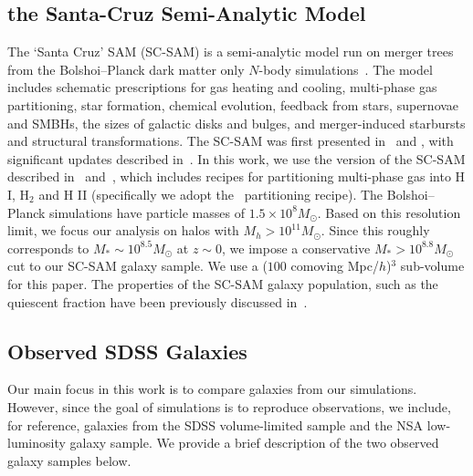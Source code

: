 \documentclass[preprint2,tighten]{aastex62}
\begin{document}
\subsection{the Santa-Cruz Semi-Analytic Model} \label{sec:scsam}
The `Santa Cruz' SAM (SC-SAM) is a semi-analytic model run on 
merger trees from the Bolshoi--Planck dark matter only $N$-body 
simulations~\citep{rodriguez-puebla2016}. The model includes 
schematic prescriptions for gas heating and cooling, multi-phase 
gas partitioning, star formation, chemical evolution, feedback 
from stars, supernovae and SMBHs, the sizes of galactic disks and 
bulges, and merger-induced starbursts and structural transformations. 
The SC-SAM was first presented in~\cite{somerville1999} and 
\cite{somerville2001}, with significant updates described 
in~\cite{somerville2008, somerville2008a, somerville2012, porter2014, 
popping2014, somerville2015a}. In this work, we use the version of 
the SC-SAM described in~\cite{popping2014} and~\cite{somerville2015a}, 
which includes recipes for partitioning multi-phase gas into H I, 
H$_2$ and H II (specifically we adopt the~\citealt{gnedin2011} 
partitioning recipe). The Bolshoi--Planck simulations have particle 
masses of $1.5 \times 10^8 M_\odot$. Based on this resolution limit, 
we focus our analysis on halos with $M_h > 10^{11} M_\odot$.
Since this roughly corresponds to $M_* \sim 10^{8.5} M_\odot$ at 
$z\sim 0$, we impose a conservative $M_* > 10^{8.8}M_\odot$ cut 
to our SC-SAM galaxy sample. We use a ($100$ comoving Mpc/$h$)$^3$
sub-volume for this paper. The properties of the SC-SAM galaxy population, 
such as the quiescent fraction have been previously discussed 
in~\cite{brennan2015,somerville2015b,brennan2017,pandya2017}.


\subsection{Observed SDSS Galaxies} \label{sec:obvs}
Our main focus in this work is to compare galaxies from our 
simulations. However, since the goal of simulations is to 
reproduce observations, we include, for reference, galaxies 
from the SDSS volume-limited sample and the NSA low-luminosity 
galaxy sample. We provide a brief description of the two 
observed galaxy samples below. 
\end{document}
